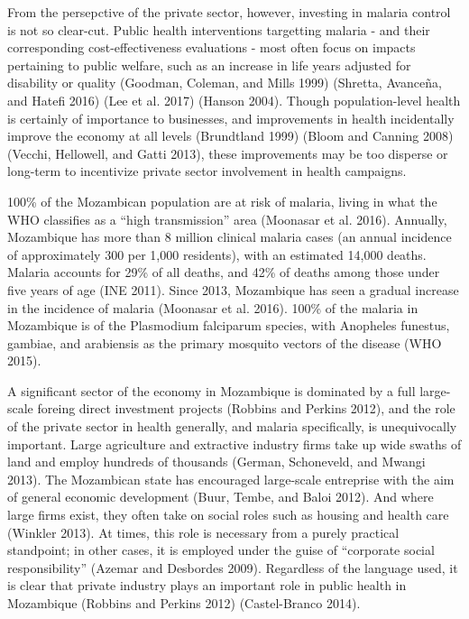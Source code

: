 \documentclass[]{article}
\begin{document}
From the persepctive of the private sector, however, investing in
malaria control is not so clear-cut. Public health interventions
targetting malaria - and their corresponding cost-effectiveness
evaluations - most often focus on impacts pertaining to public welfare,
such as an increase in life years adjusted for disability or quality
(Goodman, Coleman, and Mills 1999) (Shretta, Avanceña, and Hatefi 2016)
(Lee et al. 2017) (Hanson 2004). Though population-level health is
certainly of importance to businesses, and improvements in health
incidentally improve the economy at all levels (Brundtland 1999) (Bloom
and Canning 2008) (Vecchi, Hellowell, and Gatti 2013), these
improvements may be too disperse or long-term to incentivize private
sector involvement in health campaigns.

100\% of the Mozambican population are at risk of malaria, living in
what the WHO classifies as a ``high transmission'' area (Moonasar et al.
2016). Annually, Mozambique has more than 8 million clinical malaria
cases (an annual incidence of approximately 300 per 1,000 residents),
with an estimated 14,000 deaths. Malaria accounts for 29\% of all
deaths, and 42\% of deaths among those under five years of age (INE
2011). Since 2013, Mozambique has seen a gradual increase in the
incidence of malaria (Moonasar et al. 2016). 100\% of the malaria in
Mozambique is of the Plasmodium falciparum species, with Anopheles
funestus, gambiae, and arabiensis as the primary mosquito vectors of the
disease (WHO 2015).

A significant sector of the economy in Mozambique is dominated by a full
large-scale foreing direct investment projects (Robbins and Perkins
2012), and the role of the private sector in health generally, and
malaria specifically, is unequivocally important. Large agriculture and
extractive industry firms take up wide swaths of land and employ
hundreds of thousands (German, Schoneveld, and Mwangi 2013). The
Mozambican state has encouraged large-scale entreprise with the aim of
general economic development (Buur, Tembe, and Baloi 2012). And where
large firms exist, they often take on social roles such as housing and
health care (Winkler 2013). At times, this role is necessary from a
purely practical standpoint; in other cases, it is employed under the
guise of ``corporate social responsibility'' (Azemar and Desbordes
2009). Regardless of the language used, it is clear that private
industry plays an important role in public health in Mozambique (Robbins
and Perkins 2012) (Castel-Branco 2014).
\end{document}
